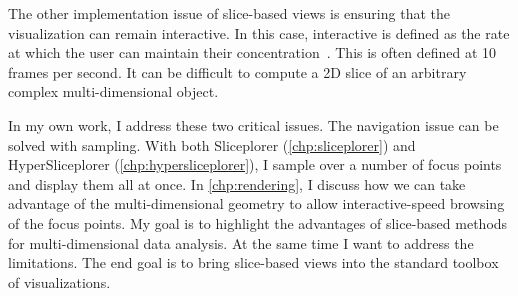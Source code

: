 The other implementation issue of slice-based views is ensuring that the
visualization can remain interactive. In this case, interactive is defined as
the rate at which the user can maintain their
concentration~\cite{Shneiderman:1987}. This is often defined at 10 frames per
second. It can be difficult to compute a 2D slice of an arbitrary complex
multi-dimensional object. 

In my own work, I address these two critical issues. The navigation issue can
be solved with sampling. With both Sliceplorer (\autoref{chp:sliceplorer}) and
HyperSliceplorer (\autoref{chp:hypersliceplorer}), I sample over a number of
focus points and display them all at once. In \autoref{chp:rendering}, I
discuss how we can take advantage of the multi-dimensional geometry to allow
interactive-speed browsing of the focus points. My goal is to highlight the
advantages of slice-based methods for multi-dimensional data analysis. At the
same time I want to address the limitations. The end goal is to bring
slice-based views into the standard toolbox of visualizations.




